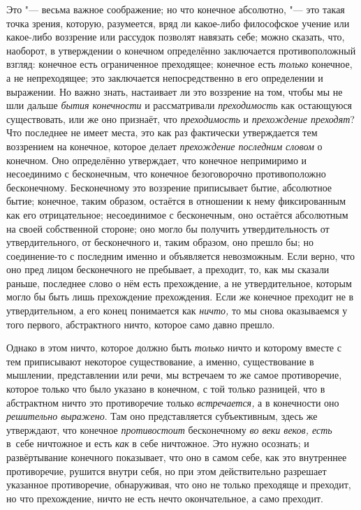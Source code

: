 Это "--- весьма важное соображение; но что конечное абсолютно, "--- это такая
точка зрения, которую, разумеется, вряд ли какое-либо философское учение
или какое-либо воззрение или рассудок позволят навязать себе; можно
сказать, что, наоборот, в утверждении о конечном определённо заключается
противоположный взгляд: конечное есть ограниченное преходящее; конечное
есть {\em только} конечное, а не непреходящее; это
заключается непосредственно в его определении и выражении. Но важно знать,
настаивает ли это воззрение на том, чтобы мы не шли дальше
{\em бытия конечности} и рассматривали
{\em преходимость} как остающуюся существовать, или же
оно признаёт, что {\em преходимость} и
{\em прехождение преходят}? Что последнее не имеет
места, это как раз фактически утверждается тем воззрением на конечное,
которое делает {\em прехождение последним словом} о
конечном. Оно определённо утверждает, что конечное непримиримо и
несоединимо с бесконечным, что конечное безоговорочно противоположно
бесконечному. Бесконечному это воззрение приписывает бытие, абсолютное
бытие; конечное, таким образом, остаётся в отношении к нему фиксированным
как его отрицательное; несоединимое с бесконечным, оно остаётся абсолютным
на своей собственной стороне; оно могло бы получить утвердительность от
утвердительного, от бесконечного и, таким образом, оно прешло бы; но
соединение-то с последним именно и объявляется невозможным. Если верно, что
оно пред лицом бесконечного не пребывает, а преходит, то, как мы сказали
раньше, последнее слово о нём есть прехождение, а не утвердительное,
которым могло бы быть лишь прехождение прехождения. Если же конечное
преходит не в утвердительном, а его конец понимается как
{\em ничто,} то мы снова оказываемся у того первого,
абстрактного ничто, которое само давно прешло.

Однако в этом ничто, которое должно быть {\em только}
ничто и которому вместе с тем приписывают некоторое существование, а
именно, существование в мышлении, представлении или речи, мы встречаем то
же самое противоречие, которое только что было указано в конечном, с той
только разницей, что в абстрактном ничто это противоречие только
{\em встречается,} а в конечности оно
{\em решительно выражено}. Там оно представляется
субъективным, здесь же утверждают, что конечное
{\em противостоит} бесконечному
{\em во веки веков, есть} в~себе ничтожное и есть {\em как} в себе ничтожное.
Это нужно осознать; и развёртывание конечного показывает, что оно в самом себе,
как это внутреннее противоречие, рушится внутри себя, но при этом
действительно разрешает указанное противоречие, обнаруживая, что оно не
только преходяще и преходит, но что прехождение, ничто не есть нечто
окончательное, а само преходит.

